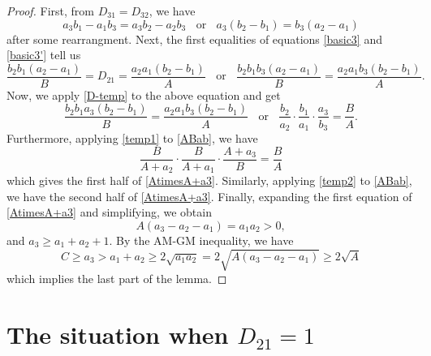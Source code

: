 \documentclass[12pt]{article}
\begin{document}
\begin{proof}
First, from $D_{31} = D_{32}$, we have
\begin{equation} \label{D-temp}
a_3 b_1 - a_1 b_3 = a_3 b_2 - a_2 b_3 \; \; \text{ or } \; \; a_3 (b_2 - b_1) = b_3 (a_2 - a_1)
\end{equation}
after some rearrangment. Next, the first equalities of equations \eqref{basic3} and \eqref{basic3'} tell us
\begin{equation*}
    \frac{b_2 b_1 (a_2 - a_1)}{B} = D_{21} = \frac{a_2 a_1 (b_2 - b_1)}{A} \; \; \text{ or } \; \; \frac{b_2 b_1 b_3 (a_2 - a_1)}{B} = \frac{a_2 a_1 b_3 (b_2 - b_1)}{A}.
\end{equation*}
Now, we apply \eqref{D-temp} to the above equation and get
\begin{equation} \label{ABab}
    \frac{b_2 b_1 a_3 (b_2 - b_1)}{B} = \frac{a_2 a_1 b_3 (b_2 - b_1)}{A} \; \; \text{ or } \; \; \frac{b_2}{a_2} \cdot \frac{b_1}{a_1} \cdot \frac{a_3}{b_3} = \frac{B}{A}.
\end{equation}
Furthermore, applying \eqref{temp1} to \eqref{ABab}, we have 
\begin{equation*}
    \frac{B}{A+a_2}\cdot \frac{B}{A+a_1}\cdot \frac{A+a_3}{B} = \frac{B}{A}
\end{equation*}
which gives the first half of \eqref{AtimesA+a3}. Similarly, applying \eqref{temp2} to \eqref{ABab}, we have the second half of \eqref{AtimesA+a3}. Finally, expanding the first equation of \eqref{AtimesA+a3} and simplifying, we obtain
\[
A (a_3 - a_2 - a_1) = a_1 a_2 > 0,
\]
and $a_3 \ge a_1 + a_2 + 1$. By the AM-GM inequality, we have
\[
C \ge a_3 > a_1 + a_2 \ge 2\sqrt{a_1a_2} = 2\sqrt{A(a_3-a_2-a_1)} \ge 2\sqrt{A}
\]
which implies the last part of the lemma.
\end{proof}




\section{The situation when $D_{21} = 1$}
\end{document}
